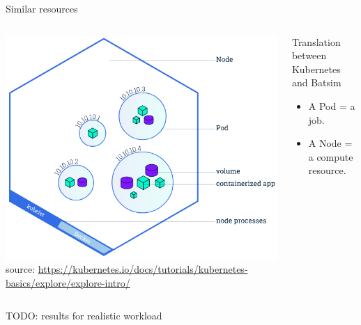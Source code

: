 \documentclass[12pt, aspectratio=43]{beamer}
\newcommand{\backupend}{
   \addtocounter{framenumberappendix}{-\value{framenumber}}
   \addtocounter{framenumber}{\value{framenumberappendix}} 
}
\begin{document}
\begin{frame}{Similar resources}
	\begin{columns}
		\centering
		\includegraphics[width=\textwidth]{../imgs/node-overview.png}
		\tiny{source: \url{https://kubernetes.io/docs/tutorials/kubernetes-basics/explore/explore-intro/}}

		\begin{block}{Translation between Kubernetes and Batsim}
			\begin{itemize}
				\item A Pod = a job.
				\item A Node = a compute resource.
			\end{itemize}
		\end{block}
	\end{columns}
\end{frame}

\begin{frame}
	TODO: results for realistic workload
\end{frame}

\backupend
\end{document}
